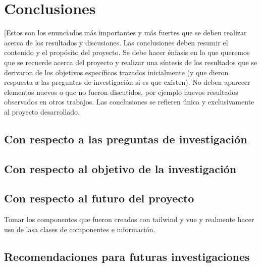 \chapter{Conclusiones}\label{conclusiones}
[Estos son los enunciados más importantes y más fuertes que se deben realizar acerca de los resultados y discusiones. Las conclusiones deben resumir el contenido y el propósito del proyecto. Se debe hacer énfasis en lo que queremos que se recuerde acerca del proyecto y realizar una síntesis de los resultados que se derivaron de los objetivos específicos trazados inicialmente (y que dieron respuesta a las preguntas de investigación si es que existen). No deben aparecer elementos nuevos o que no fueron discutidos, por ejemplo nuevos resultados observados en otros trabajos. Las conclusiones se refieren única y exclusivamente al proyecto desarrollado.

\section{Con respecto a las preguntas de investigación}

\section{Con respecto al objetivo de la investigación}


\section{Con respecto al futuro del proyecto}

Tomar los componentes que fueron creados con tailwind y vue y realmente hacer uso de lasa clases de componentes e información.

\section{Recomendaciones para futuras investigaciones}





